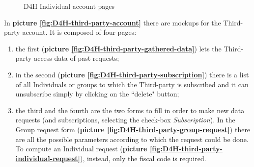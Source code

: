 \begin{figure}[H]
  \centering
  
  \caption{D4H Individual account pages}
  \label{fig:D4H-individual-account}
\end{figure}

In \textbf{picture \ref{fig:D4H-third-party-account}} there are mockups for the Third-party account. It is composed of four pages: 
\begin{enumerate}
    \item the first (\textbf{picture \ref{fig:D4H-third-party-gathered-data}}) lets the Third-party access data of past requests; 
    \item in the second (\textbf{picture \ref{fig:D4H-third-party-subscription}}) there is a list of all Individuals or groups to which the Third-party is subscribed and it can unsubscribe simply by clicking on the ``delete" button;
    \item the third and the fourth are the two forms to fill in order to make new data requests (and subscriptions, selecting the check-box \emph{Subscription}). In the Group request form (\textbf{picture \ref{fig:D4H-third-party-group-request}}) there are all the possible parameters according to which the request could be done. To compute an Individual request (\textbf{picture \ref{fig:D4H-third-party-individual-request}}), instead, only the fiscal code is required.
\end{enumerate}



